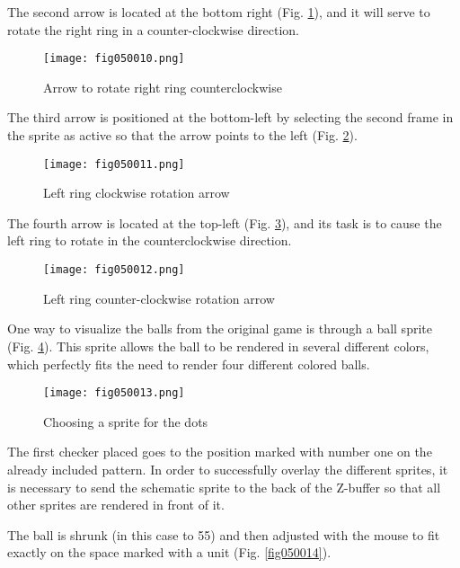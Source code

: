 The second arrow is located at the bottom right (Fig. \ref{fig050010}), and it will serve to rotate the right ring in a counter-clockwise direction.

\begin{figure}[H]
   \centering
   \texttt{[image: fig050010.png]}
   \caption{Arrow to rotate right ring counterclockwise}
\label{fig050010}
\end{figure}

The third arrow is positioned at the bottom-left by selecting the second frame in the sprite as active so that the arrow points to the left (Fig. \ref{fig050011}).

\begin{figure}[H]
   \centering
   \texttt{[image: fig050011.png]}
   \caption{Left ring clockwise rotation arrow}
\label{fig050011}
\end{figure}

The fourth arrow is located at the top-left (Fig. \ref{fig050012}), and its task is to cause the left ring to rotate in the counterclockwise direction.

\begin{figure}[H]
   \centering
\texttt{[image: fig050012.png]}
   \caption{Left ring counter-clockwise rotation arrow}
\label{fig050012}
\end{figure}

One way to visualize the balls from the original game is through a ball sprite (Fig. \ref{fig050013}). This sprite allows the ball to be rendered in several different colors, which perfectly fits the need to render four different colored balls.

\begin{figure}[H]
   \centering
   \texttt{[image: fig050013.png]}
   \caption{Choosing a sprite for the dots}
\label{fig050013}
\end{figure}

The first checker placed goes to the position marked with number one on the already included pattern. In order to successfully overlay the different sprites, it is necessary to send the schematic sprite to the back of the Z-buffer so that all other sprites are rendered in front of it.

The ball is shrunk (in this case to 55) and then adjusted with the mouse to fit exactly on the space marked with a unit (Fig. \ref{fig050014}).

